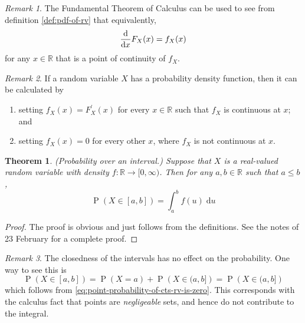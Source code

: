 \documentclass[11pt]{article}
\newtheorem{thm}{Theorem}
\theoremstyle{definition}
\theoremstyle{remark}
\newtheorem{rem}{Remark}[section]
\newcommand{\parens}[1]{\left(#1\right)}
\renewcommand{\d}{\mathrm{d}}
\newcommand{\intd}{\;\d}
\newcommand{\deriv}[2][]{%
    \ensuremath
    \frac{\d #1}{\d #2}
}
\newcommand{\R}{\mathbb{R}}
\DeclareMathOperator{\Prob}{P}
\renewcommand{\P}[1]{\Prob{\parens{#1}}}
\newcommand{\pdf}{probability density function}
\begin{document}
\begin{rem}
    \label{rem:pdf-of-rv-deriv}
    The Fundamental Theorem of Calculus can be used to see from definition
    \ref{def:pdf-of-rv} that equivalently,
    \begin{equation}
        \label{eq:pdf-of-rv-deriv}
        \deriv{x} F_X (x) = f_X(x)
    \end{equation}
    for any $x \in \R$ that is a point of continuity of $f_X$.
\end{rem}

\begin{rem}
    \label{rem:calculation-of-pdf}
    If a random variable $X$ has a \pdf, then it can be calculated by
    \begin{enumerate}
        \item
            setting $f_X (x) = F^\prime_X(x)$
            for every $x \in \R$ such that $f_X$ is continuous at $x$;
            and
        \item
            setting $f_X (x) = 0$ for every other $x$,
            where $f_X$ is not continuous at $x$.
    \end{enumerate}
\end{rem}

\begin{thm}{(Probability over an interval.)}
    \label{thm:prob-interval}
    Suppose that $X$ is a real-valued random variable with density
    $f : \R \to [0, \infty)$.
    Then for any $a, b \in \R$ such that $a \leq b$,
    \begin{equation}
        \label{eq:prob-interval}
        \P{X \in [a, b]}
        = \int_a^b { f(u) \intd u }
    \end{equation}
\end{thm}

\begin{proof}
    The proof is obvious and just follows from the definitions.
    See the notes of 23 February for a complete proof.
\end{proof}

\begin{rem}
    The closedness of the intervals has no effect on the probability.
    One way to see this is
    \begin{equation*}
        \P{X \in [a, b]}
        = \P{X = a} + \P{X \in (a, b]}
        = \P{X \in (a, b]}
    \end{equation*}
    which follows from \eqref{eq:point-probability-of-cts-rv-is-zero}.
    This corresponds with the calculus fact that points are \emph{negligeable}
    sets, and hence do not contribute to the integral.
\end{rem}
\end{document}
